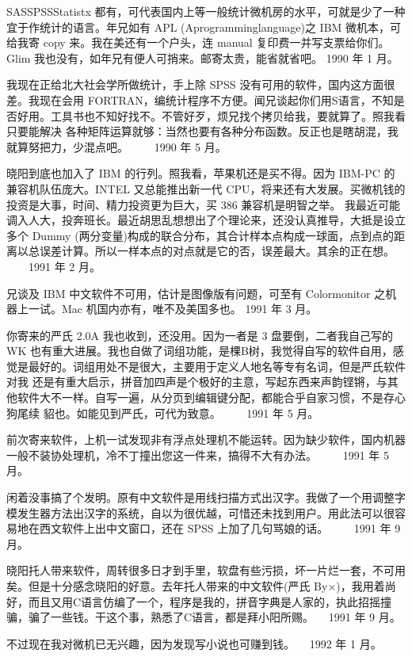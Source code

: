 SASSPSSStatistx 都有，可代表国内上等一般统计微机房的水平，可就是少了一种宜于作统计的语言。年兄如有 APL (Aprogramminglanguage)之 IBM 微机本，可给我寄 copy 来。我在美还有一个户头，连 manual 复印费一并写支票给你们。Glim 我也没有，如年兄有便人可捎来。邮寄太贵，能省就省吧。
1990 年 1 月。

我现在正给北大社会学所做统计，手上除 SPSS 没有可用的软件，国内这方面很差。我现在会用 FORTRAN，编统计程序不方便。闻兄谈起你们用S语言，不知是否好用。工具书也不知好找不。不管好歹，烦兄找个拷贝给我，要就算了。照我看只要能解决 各种矩阵运算就够：当然也要有各种分布函数。反正也是瞎胡混，我就算努把力，少混点吧。
　　1990 年 5 月。

晓阳到底也加入了 IBM 的行列。照我看，苹果机还是买不得。因为 IBM-PC 的兼容机队伍庞大。INTEL 又总能推出新一代 CPU，将来还有大发展。买微机钱的投资是大事，时间、精力投资更为巨大，买 386 兼容机是明智之举。 我最近可能调入人大，投奔班长。最近胡思乱想想出了个理论来，还没认真推导，大抵是设立多个 Dummy (两分变量)构成的联合分布，其合计样本点构成一球面，点到点的距离以总误差计算。所以一样本点的对点就是它的否，误差最大。其余的正在想。
　　1991 年 2 月。

兄谈及 IBM 中文软件不可用，估计是图像版有问题，可至有 Colormonitor 之机器上一试。Mac 机国内亦有，唯不及美国多也。
1991 年 3 月。

你寄来的严氏 2.0A 我也收到，还没用。因为一者是 3 盘要倒，二者我自己写的 WK 也有重大进展。我也自做了词组功能，是棵B树，我觉得自写的软件自用，感觉是最好的。词组用处不是很大，主要用于定义人地名等专有名词，但是严氏软件对我 还是有重大启示，拼音加四声是个极好的主意，写起东西来声韵铿锵，与其他软件大不一样。自写一遍，从分页到编辑键分配，都能合乎自家习惯，不是存心狗尾续 貂也。如能见到严氏，可代为致意。
　　1991 年 5 月。

前次寄来软件，上机一试发现非有浮点处理机不能运转。因为缺少软件，国内机器一般不装协处理机，冷不丁撞出您这一件来，搞得不大有办法。
　　1991 年 5 月。

闲着没事搞了个发明。原有中文软件是用线扫描方式出汉字。我做了一个用调整字模发生器方法出汉字的系统，自以为很优越，可惜还未找到用户。用此法可以很容易地在西文软件上出中文窗口，还在 SPSS 上加了几句骂娘的话。
　　1991 年 9 月。

晓阳托人带来软件，周转很多日才到手里，软盘有些污损，坏一片烂一套，不可用矣。但是十分感念晓阳的好意。去年托人带来的中文软件(严氏 By×)，我用着尚好，而且又用C语言仿编了一个，程序是我的，拼音字典是人家的，执此招摇撞骗，骗了一些钱。干这个事，熟悉了C语言，都是拜小阳所赐。
　1991 年 9 月。

不过现在我对微机已无兴趣，因为发现写小说也可赚到钱。
　1992 年 1 月。

